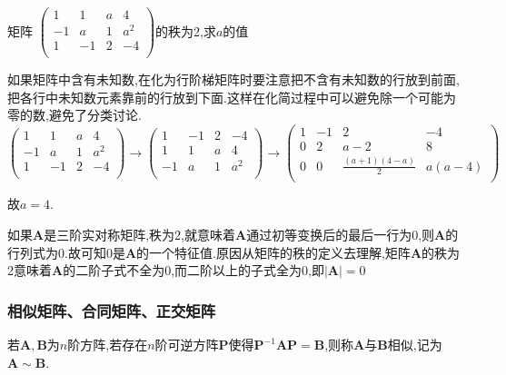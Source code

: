 \begin{examp}{矩阵
    $\begin{pmatrix}
    1   &   1   &   a   &   4   \\
    -1   &   a   &   1   &   a^2   \\
    1   &   -1   &   2   &   -4   \\
    \end{pmatrix}$的秩为2,求$a$的值}

    \jie 如果矩阵中含有未知数,在化为行阶梯矩阵时要注意把不含有未知数的行放到前面,把各行中未知数元素靠前的行放到下面.这样在化简过程中可以避免除一个可能为零的数,避免了分类讨论.
    \begin{equation*}
        \begin{pmatrix}
        1   &   1   &   a   &   4   \\
        -1   &   a   &   1   &   a^2   \\
        1   &   -1   &   2   &   -4   \\
        \end{pmatrix}
    \rightarrow 
        \begin{pmatrix}
        1   &   -1   &   2   &   -4   \\
        1   &   1   &   a   &   4   \\
        -1   &   a   &   1   &   a^2   \\
        \end{pmatrix}
    \rightarrow
        \begin{pmatrix}
        1   &   -1   &   2   &   -4   \\
        0   &   2   &   a-2   &   8   \\
        0   &   0   &   \frac{(a+1)(4-a)}{2}   &   a(a-4)   \\
        \end{pmatrix}
    \end{equation*}

    故$a=4$.
\end{examp}

如果$\mathbf{A}$是三阶实对称矩阵,秩为2,就意味着$\mathbf{A}$通过初等变换后的最后一行为0,则$\mathbf{A}$的行列式为0.故可知0是$\mathbf{A}$的一个特征值.原因从矩阵的秩的定义去理解,矩阵$\mathbf{A}$的秩为2意味着$\mathbf{A}$的二阶子式不全为0,而二阶以上的子式全为0,即$\left\lvert \mathbf{A}\right\rvert =0$

\subsubsection{相似矩阵、合同矩阵、正交矩阵}
\begin{definition}
    若$\mathbf{A},\mathbf{B}$为$n$阶方阵,若存在$n$阶可逆方阵$\mathbf{P}$使得$\mathbf{P}^{-1}\mathbf{A}\mathbf{P}=\mathbf{B}$,则称$\mathbf{A}$与$\mathbf{B}$相似,记为$\mathbf{A}\sim \mathbf{B}$.
\end{definition}

